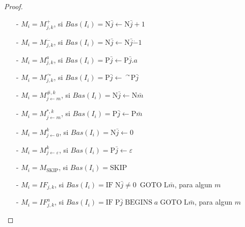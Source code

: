 \begin{frame}
  \begin{proof}
  \begin{enumerate}
  \item[-] $M_{i}=M_{j,k}^{+}$, si $Bas(I_{i})=\mathrm{N}\bar{j}\leftarrow
  \mathrm{N}\bar{j}+1$

  \item[-] $M_{i}=M_{j,k}^{\dot{-}}$, si $Bas(I_{i})=\mathrm{N}\bar{j}%
  \leftarrow \mathrm{N}\bar{j}\dot{-}1$

  \item[-] $M_{i}=M_{j,k}^{a}$, si $Bas(I_{i})=\mathrm{P}\bar{j}\leftarrow
  \mathrm{P}\bar{j}.a$

  \item[-] $M_{i}=M_{j,k}^{\curvearrowright }$, si $Bas(I_{i})=\mathrm{P}\bar{j%
  }\leftarrow \ ^{\curvearrowright }\mathrm{P}\bar{j}$

  \item[-] $M_{i}=M_{j\leftarrow m}^{\#,k}$, si $Bas(I_{i})=\mathrm{N}\bar{j}%
  \leftarrow \mathrm{N}\bar{m}$

  \item[-] $M_{i}=M_{j\leftarrow m}^{\ast ,k}$, si $Bas(I_{i})=\mathrm{P}\bar{j%
  }\leftarrow \mathrm{P}\bar{m}$

  \item[-] $M_{i}=M_{j\leftarrow 0}^{k}$, si $Bas(I_{i})=\mathrm{N}\bar{j}%
  \leftarrow 0$

  \item[-] $M_{i}=M_{j\leftarrow \varepsilon }^{k}$, si $Bas(I_{i})=\mathrm{P}%
  \bar{j}\leftarrow \varepsilon $

  \item[-] $M_{i}=M_{\mathrm{SKIP}}$, si $Bas(I_{i})=\mathrm{SKIP}$

  \item[-] $M_{i}=IF_{j,k}$, si $Bas(I_{i})=\mathrm{IF}\;\mathrm{N}\bar{j}%
  \not=0$\ $\mathrm{GOTO}\;\mathrm{L}\bar{m}$, para algun $m$

  \item[-] $M_{i}=IF_{j,k}^{a}$, si $Bas(I_{i})=\mathrm{IF}\;\mathrm{P}\bar{j}%
  \;\mathrm{BEGINS}\;a\;\mathrm{GOTO}\;\mathrm{L}\bar{m}$, para algun $m$
  \end{enumerate}
  \end{proof}
\end{frame}
